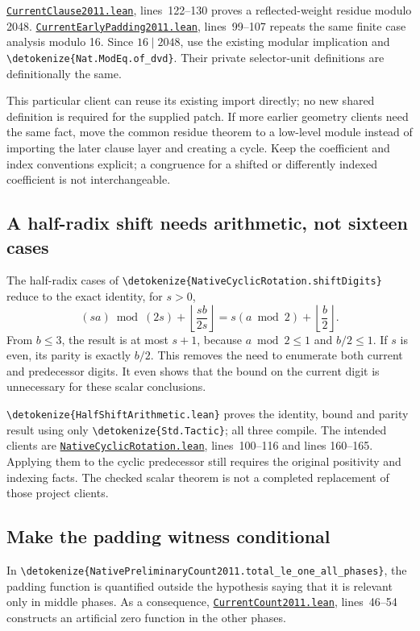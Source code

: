 \documentclass[11pt,letterpaper]{article}
\newcommand{\code}[1]{\expandafter\nolinkurl\expandafter{\detokenize{#1}}}
\newcommand{\repo}{https://github.com/VladimirReshetnikov/ProveIt/blob/60e9c5d620c6c387d932876cfa2d9376f64ea56c}
\newcommand{\src}[2]{\href{\repo/Computability/DiophantineConsistency/Lean/DiophantineConsistency/#1.lean}{\nolinkurl{#1.lean}}, lines~#2}
\begin{document}
\src{CurrentClause2011}{122--130} proves a reflected-weight residue modulo 2048. \src{CurrentEarlyPadding2011}{99--107} repeats the same finite case analysis modulo 16. Since $16\mid 2048$, use the existing modular implication and \code{Nat.ModEq.of_dvd}. Their private selector-unit definitions are definitionally the same.

This particular client can reuse its existing import directly; no new shared definition is required for the supplied patch. If more earlier geometry clients need the same fact, move the common residue theorem to a low-level module instead of importing the later clause layer and creating a cycle. Keep the coefficient and index conventions explicit; a congruence for a shifted or differently indexed coefficient is not interchangeable.

\subsection{A half-radix shift needs arithmetic, not sixteen cases}

The half-radix cases of \code{NativeCyclicRotation.shiftDigits} reduce to the exact identity, for $s>0$,
\[
(sa)\bmod(2s)+\left\lfloor\frac{sb}{2s}\right\rfloor
=s(a\bmod2)+\left\lfloor\frac b2\right\rfloor.
\]
From $b\le3$, the result is at most $s+1$, because $a\bmod2\le1$ and $b/2\le1$. If $s$ is even, its parity is exactly $b/2$. This removes the need to enumerate both current and predecessor digits. It even shows that the bound on the current digit is unnecessary for these scalar conclusions.

\code{HalfShiftArithmetic.lean} proves the identity, bound and parity result using only \code{Std.Tactic}; all three compile. The intended clients are \src{NativeCyclicRotation}{100--116} and lines 160--165. Applying them to the cyclic predecessor still requires the original positivity and indexing facts. The checked scalar theorem is not a completed replacement of those project clients.

\subsection{Make the padding witness conditional}

In \code{NativePreliminaryCount2011.total_le_one_all_phases}, the padding function is quantified outside the hypothesis saying that it is relevant only in middle phases. As a consequence, \src{CurrentCount2011}{46--54} constructs an artificial zero function in the other phases.
\end{document}
